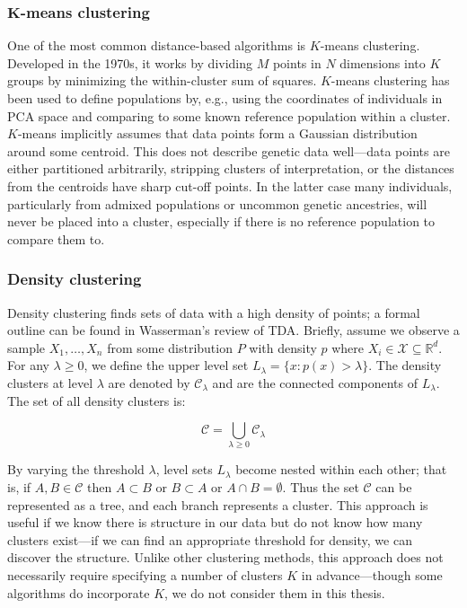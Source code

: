 \subsubsection{\texorpdfstring{$\mathbf{K}$}{f}-means clustering}

One of the most common distance-based algorithms is $K$-means clustering. Developed in the 1970s, it works by dividing $M$ points in $N$ dimensions into $K$ groups by minimizing the within-cluster sum of squares\citep{hartigan_algorithm_1979}. $K$-means clustering has been used to define populations by, e.g., using the coordinates of individuals in PCA space and comparing to some known reference population within a cluster. $K$-means implicitly assumes that data points form a Gaussian distribution around some centroid\citep{mcinnes_accelerated_2017}. This does not describe genetic data well---data points are either partitioned arbitrarily, stripping clusters of interpretation, or the distances from the centroids have sharp cut-off points. In the latter case many individuals, particularly from admixed populations or uncommon genetic ancestries, will never be placed into a cluster, especially if there is no reference population to compare them to\citep{ding_polygenic_2023}.

\subsubsection{Density clustering}


Density clustering finds sets of data with a high density of points; a formal outline can be found in Wasserman's review of TDA\citep{wasserman_topological_2018}. Briefly, assume we observe a sample $X_{1}, \dots , X_{n}$ from some distribution $P$ with density $p$ where $X_{i} \in \mathcal{X} \subseteq \mathbb{R}^d$. For any $\lambda \ge 0$, we define the upper level set $L_{\lambda} = \{x: p(x) > \lambda \}$. The density clusters at level $\lambda$ are denoted by $\mathcal{C}_{\lambda}$ and are the connected components of $L_{\lambda}$. The set of all density clusters is:

$$ \mathcal{C} = \bigcup_{\lambda \ge 0} \mathcal{C}_{\lambda} $$

By varying the threshold $\lambda$, level sets $L_{\lambda}$ become nested within each other; that is, if $A, B \in \mathcal{C}$ then $A \subset B$ or $B \subset A$ or $A \cap B = \emptyset$. Thus the set $\mathcal{C}$ can be represented as a tree, and each branch represents a cluster. This approach is useful if we know there is structure in our data but do not know how many clusters exist---if we can find an appropriate threshold for density, we can discover the structure. Unlike other clustering methods, this approach does not necessarily require specifying a number of clusters $K$ in advance---though some algorithms do incorporate $K$, we do not consider them in this thesis.

